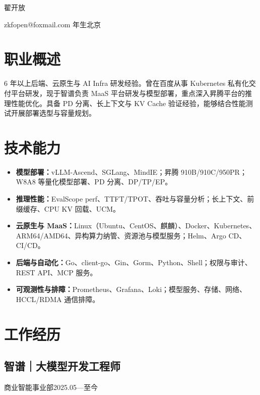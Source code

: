 \documentclass{resume}
\newcommand{\entry}[3]{%
  \subsection*{#1}%
  {\small\color{resumegray}#2\hfill #3\par}\nopagebreak[4]
}
\renewcommand{\name}[1]{%
  \centerline{{\fontsize{22pt}{26pt}\selectfont\scshape #1}}%
  \vspace{1.2ex}%
}
\begin{document}
\fontsize{10.5pt}{13.5pt}\selectfont
{}
\name{翟开放}
{\quad\textperiodcentered\quad zkfopen@foxmail.com\quad\textperiodcentered{} 年生\quad\textperiodcentered\quad 北京\par}
\vspace{4pt}



\section{职业概述}

6 年以上后端、云原生与 AI Infra 研发经验。曾在百度从事 Kubernetes 私有化交付平台研发，现于智谱负责 MaaS 平台研发与模型部署，重点深入昇腾平台的推理性能优化。具备 PD 分离、长上下文与 KV Cache 验证经验，能够结合性能测试开展部署选型与容量规划。\par

\section{技术能力}

\begin{itemize}

  \item \textbf{模型部署：}vLLM-Ascend、SGLang、MindIE；昇腾 910B/910C/950PR；W8A8 等量化模型部署、PD 分离、DP/TP/EP。

  \item \textbf{推理性能：}EvalScope perf、TTFT/TPOT、吞吐与容量分析；长上下文、前缀缓存、CPU KV 回载、UCM。

  \item \textbf{云原生与 MaaS：}Linux（Ubuntu、CentOS、麒麟）、Docker、Kubernetes、ARM64/AMD64、异构算力纳管、资源池与模型服务；Helm、Argo CD、CI/CD。

  \item \textbf{后端与自动化：}Go、client-go、Gin、Gorm、Python、Shell；权限与审计、REST API、MCP 服务。

  \item \textbf{可观测性与排障：}Prometheus、Grafana、Loki；模型服务、存储、网络、HCCL/RDMA 通信排障。

\end{itemize}

\section{工作经历}

\entry{智谱｜大模型开发工程师}{商业智能事业部}{2025.05—至今}
\end{document}

